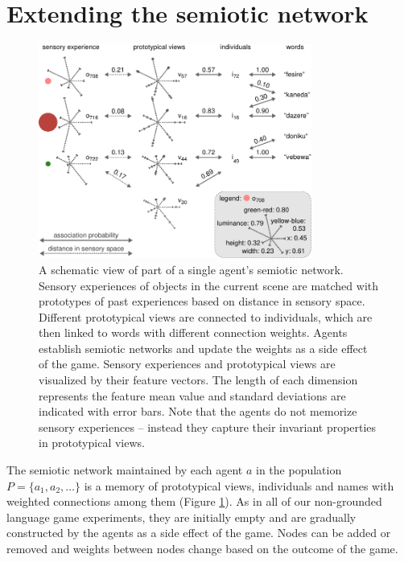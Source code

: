 \section{Extending the semiotic network}
\label{s:gng-semiotic-networks}

\begin{figure}[t]
  \centerline{\includegraphics[width=0.8\textwidth]{figures/gng-semiotic-network}}
  \caption{A schematic view of part of a single agent's semiotic
    network. Sensory experiences of objects in the current scene are
    matched with prototypes of past experiences based on distance in
    sensory space. Different prototypical views are connected to
    individuals, which are then linked to words with different
    connection weights. Agents establish semiotic networks and update
    the weights as a side effect of the game. Sensory experiences and
    prototypical views are visualized by their feature vectors. The
    length of each dimension represents the feature mean value and
    standard deviations are indicated with error bars. Note that the
    agents do not memorize sensory experiences -- instead they capture
    their invariant properties in prototypical views.}
  \label{f:gng-semiotic-network}
\end{figure}


The semiotic network maintained by each agent $a$ in the population $P
= \{a_1,a_2,\dots\}$ is a memory of prototypical views, individuals
and names with weighted connections among them (Figure
\ref{f:gng-semiotic-network}). As in all of our non-grounded language
game experiments, they are initially empty and are gradually
constructed by the agents as a side effect of the game. Nodes can be
added or removed and weights between nodes change based on the outcome
of the game.

